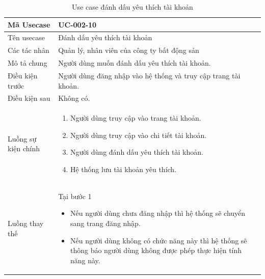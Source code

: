 \documentclass[12pt,a4paper]{article}
\begin{document}
    \begin{table}[H]
        \centering
        \begin{tabular}{|p{3.5cm}|p{11.5cm}|c|}
            \hline
            Mã Usecase      & UC-002-10                                                      \\
            \hline
            Tên usecase     & Đánh dấu yêu thích tài khoản                                   \\
            \hline
            Các tác nhân    & Quản lý, nhân viên của công ty bất động sản                    \\
            \hline
            Mô tả chung     & Người dùng muốn đánh dấu yêu thích tài khoản.                  \\
            \hline
            Điều kiện trước & Người dùng đăng nhập vào hệ thống và truy cập trang tài khoản. \\
            \hline
            Điều kiện sau   & Không có.                                                      \\
            \hline
            Luồng sự kiện chính & \vspace{-.8cm}\begin{enumerate}
                                                    \item Người dùng truy cập vào trang tài khoản.
                                                    \item Người dùng truy cập vào chi tiết tài khoản.
                                                    \item Người dùng đánh dấu yêu thích tài khoản.
                                                    \item Hệ thống lưu tài khoản yêu thích.
            \end{enumerate}
            \\
            \hline
            Luồng thay thế & Tại bước 1\newline
            \vspace{-.8cm}\begin{itemize}
                              \item Nếu người dùng chưa đăng nhập thì hệ thống sẽ chuyển sang trang đăng nhập.
                              \item Nếu người dùng không có chức năng này thì hệ thống sẽ thông báo người dùng không được phép thực hiện tính năng này.
            \end{itemize}
            \\ \hline
        \end{tabular}
        \caption{Use case đánh dấu yêu thích tài khoản}
    \end{table}
\end{document}
